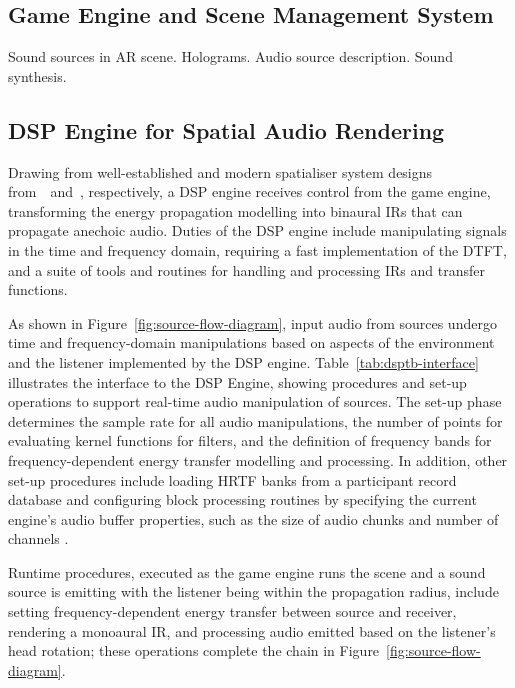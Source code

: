\subsection{Game Engine and Scene Management System}
Sound sources in AR scene. Holograms. Audio source description. Sound synthesis.

\subsection{DSP Engine for Spatial Audio Rendering}
Drawing from well-established and modern spatialiser system designs from~\cite{naef2002spatialized}~and~\cite{lakka2021x3d}, respectively, a DSP engine receives control from the game engine, transforming the energy propagation modelling into binaural IRs that can propagate anechoic audio. Duties of the DSP engine include manipulating signals in the time and frequency domain, requiring a fast implementation of the DTFT, and a suite of tools and routines for handling and processing IRs and transfer functions.\par
As shown in Figure~\ref{fig:source-flow-diagram}, input audio from sources undergo time and frequency-domain manipulations based on aspects of the environment and the listener implemented by the DSP engine. Table~\ref{tab:dsptb-interface} illustrates the interface to the DSP Engine, showing procedures and set-up operations to support real-time audio manipulation of sources. The set-up phase determines the sample rate for all audio manipulations, the number of points for evaluating kernel functions for filters, and the definition of frequency bands for frequency-dependent energy transfer modelling and processing. In addition, other set-up procedures include loading HRTF banks from a participant record database and configuring block processing routines by specifying the current engine's audio buffer properties, such as the size of audio chunks and number of channels \citep{hoene2017mysofa}.\par
Runtime procedures, executed as the game engine runs the scene and a sound source is emitting with the listener being within the propagation radius, include setting frequency-dependent energy transfer between source and receiver, rendering a monoaural IR, and processing audio emitted based on the listener's head rotation; these operations complete the chain in Figure~\ref{fig:source-flow-diagram}.\par



